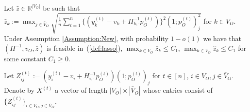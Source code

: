 \documentclass[opre,nonblindrev]{informs3} %
\begin{document}
\begin{APPENDIX}{}
\begin{lemma}\label{lem:Alg1:Step1}
	Let $\bar z \in \mathbb{R}^{|{V}_O|}$ be such that
		$\bar{z}_k := \max_{j\in \bar V_O}
		\sqrt{ \frac{1}{n}\sum_{t=1}^{n} \{(y_k^{(t)} -  v_k+ H^{-1}_{k,\cdot}p_O^{(t)})\}^2(1;p_O^{(t)})_j^2}$
	for $k\in V_O$.	
Under Assumption \ref{Assumption:New}, with probability $1-o(1)$ we have that
	$(H^{-1}, v_O, \bar{z})$ is feasible in~(\ref{def:lasso}),
	$\max_{k\in  V_O} \bar z_k \leq C_1$,
		$\max_{k\in  V_O} \hat z_k \leq C_1$ for some constant $C_1 \geq 0$.
\end{lemma}
Let
$Z^{(t)}_{ij} :={(y_i^{(t)} -  v_i+ H^{-1}_{i,\cdot}p_O^{(t)})(1;p_O^{(t)})_j}$ for $t\in[n]$,
$i\in V_O,j\in \bar{V}_O$.
Denote by
$X^{(t)}$  a  vector of length $| V_O| \times |\bar{V}_O|$ whose entries consist of
$\{Z^{(t)}_{ij}\}_{ i\in {V}_O,j \in \bar{V}_O }$.



\end{APPENDIX}
\end{document}
